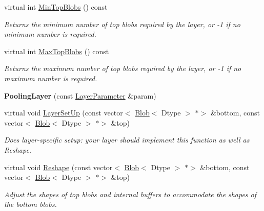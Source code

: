 \begin{DoxyCompactItemize}
virtual int \mbox{\hyperlink{classcaffe_1_1_pooling_layer_abb61ab67b2bd809c5633a2722b83feeb}{Min\+Top\+Blobs}} () const
\begin{DoxyCompactList}\small\item\em Returns the minimum number of top blobs required by the layer, or -\/1 if no minimum number is required. \end{DoxyCompactList}\item 
virtual int \mbox{\hyperlink{classcaffe_1_1_pooling_layer_a76539d04ef7252c12e932ea703f8246b}{Max\+Top\+Blobs}} () const
\begin{DoxyCompactList}\small\item\em Returns the maximum number of top blobs required by the layer, or -\/1 if no maximum number is required. \end{DoxyCompactList}\item 
\mbox{\label{classcaffe_1_1_pooling_layer_a3bc79b6101f5e21bbbfa02b7726d650c}} 
{\bfseries Pooling\+Layer} (const \mbox{\hyperlink{classcaffe_1_1_layer_parameter}{Layer\+Parameter}} \&param)
\item 
virtual void \mbox{\hyperlink{classcaffe_1_1_pooling_layer_a0b00d820b4aeb2f95cfecf3173aaa795}{Layer\+Set\+Up}} (const vector$<$ \mbox{\hyperlink{classcaffe_1_1_blob}{Blob}}$<$ Dtype $>$ $\ast$$>$ \&bottom, const vector$<$ \mbox{\hyperlink{classcaffe_1_1_blob}{Blob}}$<$ Dtype $>$ $\ast$$>$ \&top)
\begin{DoxyCompactList}\small\item\em Does layer-\/specific setup\+: your layer should implement this function as well as Reshape. \end{DoxyCompactList}\item 
virtual void \mbox{\hyperlink{classcaffe_1_1_pooling_layer_ad8ab4e6541bc0954146d62781aeb1af8}{Reshape}} (const vector$<$ \mbox{\hyperlink{classcaffe_1_1_blob}{Blob}}$<$ Dtype $>$ $\ast$$>$ \&bottom, const vector$<$ \mbox{\hyperlink{classcaffe_1_1_blob}{Blob}}$<$ Dtype $>$ $\ast$$>$ \&top)
\begin{DoxyCompactList}\small\item\em Adjust the shapes of top blobs and internal buffers to accommodate the shapes of the bottom blobs. \end{DoxyCompactList}\item 
\mbox{\label{classcaffe_1_1_pooling_layer_a630cde9866e35304372f3f93d7f6a307}} 

\end{DoxyCompactItemize}
